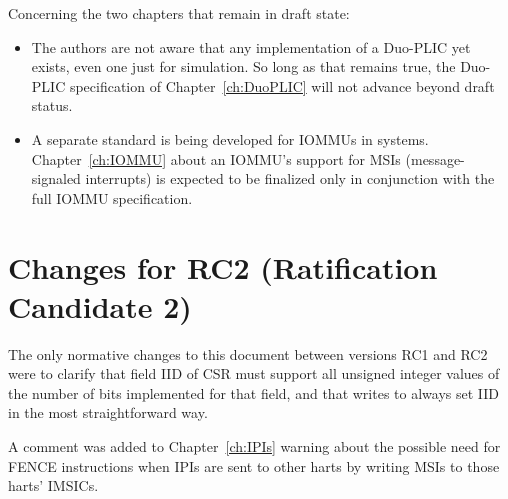 Concerning the two chapters that remain in draft state:
\begin{itemize}

\item
The authors are not aware that any implementation of
a Duo-PLIC yet exists, even one just for simulation.
So long as that remains true, the Duo-PLIC specification of
Chapter~\ref{ch:DuoPLIC} will not advance beyond draft status.

\item
A separate standard is being developed for IOMMUs in {\RISCV} systems.
Chapter~\ref{ch:IOMMU} about an IOMMU's support for MSIs
(message-signaled interrupts) is expected to be finalized
only in conjunction with the full {\RISCV} IOMMU specification.
\end{itemize}

\section*{Changes for RC2 (Ratification Candidate 2)}

The only normative changes to this document
between versions RC1 and RC2 were to clarify that
field IID of CSR  must support all
unsigned integer values of the number of bits implemented
for that field, and that writes to 
always set IID in the most straightforward way.

A comment was added to Chapter~\ref{ch:IPIs} warning about
the possible need for FENCE instructions when IPIs are
sent to other harts by writing MSIs to those harts' IMSICs.

